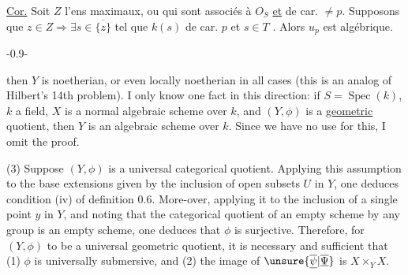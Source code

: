 
\uline{Cor.} Soit $Z$ l'ens   maximaux, ou qui sont associés  à $O_S$ \uline{et} de car. $\ne p$. Supposons que $z\in Z\Longrightarrow\exists s\in\overline{\{z\}}$ tel que $k(s)$ de car. $p$ et $s\in T$ . Alors $u_p$ est algébrique.


\begin{center}-0.9-\end{center}
then $Y$ is noetherian, or even locally noetherian in all cases (this is an analog of Hilbert's 14th problem). I only know one fact in this direction: if $S=\operatorname{Spec}(k)$, $k$ a field, $X$ is a normal algebraic scheme over $k$, and $(Y,\phi)$ is a \uline{geometric} quotient, then $Y$ is an algebraic scheme over $k$. Since we have no use for this, I omit the proof.

(3) Suppose $(Y,\phi)$ is a universal categorical quotient. Applying this assumption to the base extensions given by the inclusion of open subsets $U$ in $Y$, one deduces condition (iv) of definition 0.6. More-over, applying it to the inclusion of a single point $y$ in $Y$, and noting that the categorical quotient of an empty scheme by any group is an empty scheme, one deduces that $\phi$ is surjective. Therefore, for $(Y,\phi)$ to be a universal geometric quotient, it is necessary and sufficient that (1) $\phi$ is universally submersive, and (2) the image of $\unsure{\overline{\underline{\psi}}|\overline{\underline{\Psi}}}$ is $X\times_Y X$.


